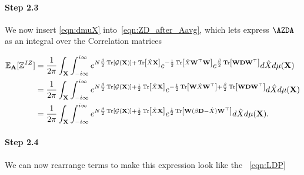 \paragraph{Step 2.3}
We now insert \ref{eqn:dmuX} into~\ref{eqn:ZD_after_Aavg},  which lets
express $\AZDA$ as an integral over the \Teacher Correlation matrices

\begin{align}
  \nonumber
  \mathbb{E}_{\mathbf{A}}[\mathbb{Z}^{IZ}]&=
  \frac{1}{2\pi} \int_{\mathbf{X}}  \int_{-i\infty}^{i\infty}
  e^{N\frac{\beta}{2} \mbox{}\operatorname{Tr}\left[\mathcal{G}(\mathbf{X})\right]+\mbox{}\operatorname{Tr}\left[\hat{X}\mathbf{X}\right] }
  e^{-\frac{1}{2}\mbox{}\operatorname{Tr}\left[\hat{X}\mathbf{W}^{\top}\mathbf{W}\right]}
  e^{\frac{\beta}{2}\mbox{}\operatorname{Tr}\left[\mathbf{W}\mathbf{D}\mathbf{W}^{\top}\right]}
  d\hat{X}  
  d\mu(\mathbf{\mathbf{X}}) \\ 
  \nonumber
  &=
  \frac{1}{2\pi} \int_{\mathbf{X}}  \int_{-i\infty}^{i\infty}
  e^{N\frac{\beta}{2}\mbox{}\operatorname{Tr}\left[\mathcal{G}(\mathbf{X})\right]+ \frac{1}{2}\mbox{}\operatorname{Tr}\left[\hat{X}\mathbf{X}\right]}
  e^{-\frac{1}{2}\mbox{}\operatorname{Tr}\left[\mathbf{W}\hat{X}\mathbf{W}^{\top}\right]+
  \frac{\beta}{2}\mbox{}\operatorname{Tr}\left[\mathbf{W}\mathbf{D}\mathbf{W}^{\top}\right]}
  d\hat{X}  
  d\mu(\mathbf{\mathbf{X}}) \\ 
  \label{eqn:ZD3}
    &=
  \frac{1}{2\pi} \int_{\mathbf{X}}  \int_{-i\infty}^{i\infty}
  e^{N\frac{\beta}{2}\mbox{}\operatorname{Tr}\left[\mathcal{G}(\mathbf{X})\right]+
  \frac{1}{2}\mbox{}\operatorname{Tr}\left[\hat{X}\mathbf{X}\right]}
  e^{\frac{1}{2}\mbox{}\operatorname{Tr}\left[\mathbf{W}(\beta\mathbf{D}-\hat{X})\mathbf{W}^{\top}\right]}
  d\hat{X}  
  d\mu(\mathbf{\mathbf{X}})  .
\end{align}

\paragraph{Step 2.4}
We can now rearrange terms to make this expression look like the \EQN~\ref{eqn:LDP}


